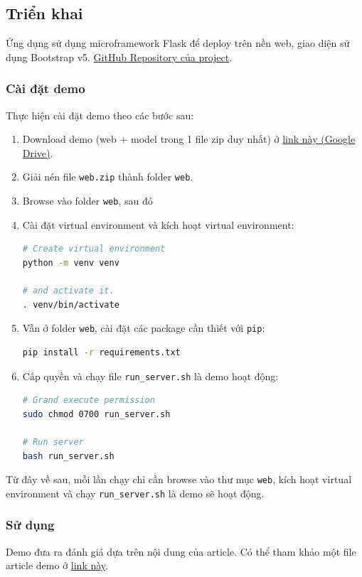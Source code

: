 \documentclass[12pt]{article}
\begin{document}
\subsection{Triển khai}
Ứng dụng sử dụng microframework Flask để deploy trên nền web, giao diện sử dụng Bootstrap v5. \href{https://github.com/trhgquan/fakenews-detection}{GitHub Repository của project}.

\subsubsection{Cài đặt demo}
Thực hiện cài đặt demo theo các bước sau:
\begin{enumerate}
\item Download demo (web + model trong 1 file zip duy nhất) ở \href{https://drive.google.com/file/d/1-7jwQowqCDU2bm2mvWxMoZPpKBew35E-/view?usp=sharing}{link này (Google Drive)}.
\item Giải nén file \texttt{web.zip} thành folder \texttt{web}.
\item Browse vào folder \texttt{web}, sau đó 
\item Cài đặt virtual environment và kích hoạt virtual environment:
\begin{lstlisting}[language=bash]
# Create virtual environment
python -m venv venv

# and activate it.
. venv/bin/activate
\end{lstlisting}

\item Vẫn ở folder \texttt{web}, cài đặt các package cần thiết với \texttt{pip}:
\begin{lstlisting}[language=bash]
pip install -r requirements.txt
\end{lstlisting}

\item Cấp quyền và chạy file \texttt{run\_server.sh} là demo hoạt động:
\begin{lstlisting}[language=bash]
# Grand execute permission
sudo chmod 0700 run_server.sh

# Run server
bash run_server.sh
\end{lstlisting}
\end{enumerate}

Từ đây về sau, mỗi lần chạy chỉ cần browse vào thư mục \texttt{web}, kích hoạt virtual environment và chạy \texttt{run\_server.sh} là demo sẽ hoạt động.

\subsubsection{Sử dụng}
Demo đưa ra đánh giá dựa trên nội dung của article. Có thể tham khảo một file article demo ở \href{https://github.com/trhgquan/fakenews-detection/blob/main/model/demo.txt}{link này}.
\end{document}

